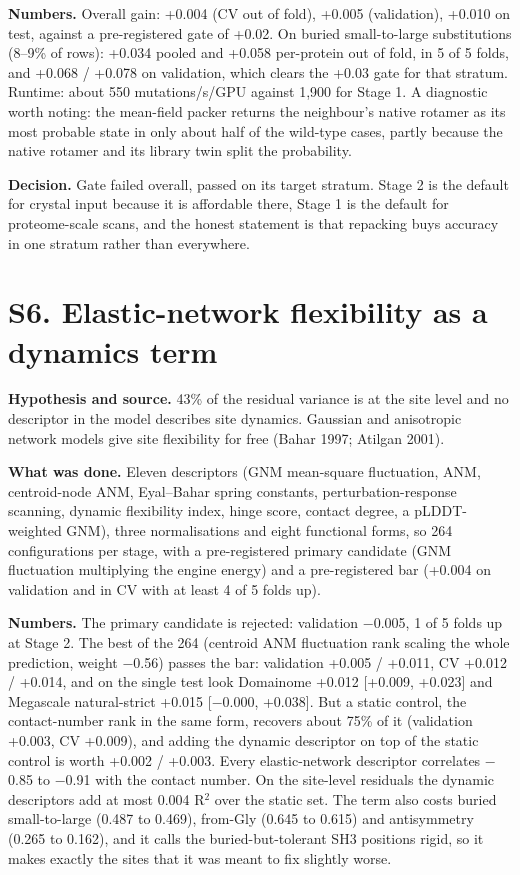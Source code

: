 \documentclass[11pt,a4paper]{article}
\begin{document}
\textbf{Numbers.} Overall gain: +0.004 (CV out of fold), +0.005 (validation), +0.010 on test, against a
pre-registered gate of +0.02. On buried small-to-large substitutions (8--9\% of rows): +0.034 pooled and +0.058
per-protein out of fold, in 5 of 5 folds, and +0.068 / +0.078 on validation, which clears the +0.03 gate for
that stratum. Runtime: about 550 mutations/s/GPU against 1,900 for Stage 1. A diagnostic worth noting: the
mean-field packer returns the neighbour's native rotamer as its most probable state in only about half of the
wild-type cases, partly because the native rotamer and its library twin split the probability.

\textbf{Decision.} Gate failed overall, passed on its target stratum. Stage 2 is the default for crystal input
because it is affordable there, Stage 1 is the default for proteome-scale scans, and the honest statement is
that repacking buys accuracy in one stratum rather than everywhere.



\section{S6. Elastic-network flexibility as a dynamics term}

\textbf{Hypothesis and source.} 43\% of the residual variance is at the site level and no descriptor in the model
describes site dynamics. Gaussian and anisotropic network models give site flexibility for free
(Bahar 1997; Atilgan 2001).

\textbf{What was done.} Eleven descriptors (GNM mean-square fluctuation, ANM, centroid-node ANM, Eyal--Bahar spring
constants, perturbation-response scanning, dynamic flexibility index, hinge score, contact degree, a
pLDDT-weighted GNM), three normalisations and eight functional forms, so 264 configurations per stage, with a
pre-registered primary candidate (GNM fluctuation multiplying the engine energy) and a pre-registered bar
(+0.004 on validation and in CV with at least 4 of 5 folds up).

\textbf{Numbers.} The primary candidate is rejected: validation $-$0.005, 1 of 5 folds up at Stage 2. The best of the
264 (centroid ANM fluctuation rank scaling the whole prediction, weight $-$0.56) passes the bar: validation
+0.005 / +0.011, CV +0.012 / +0.014, and on the single test look Domainome +0.012 [+0.009, +0.023] and
Megascale natural-strict +0.015 [$-$0.000, +0.038]. But a static control, the contact-number rank in the same
form, recovers about 75\% of it (validation +0.003, CV +0.009), and adding the dynamic descriptor on top of the
static control is worth +0.002 / +0.003. Every elastic-network descriptor correlates $-$0.85 to $-$0.91 with the
contact number. On the site-level residuals the dynamic descriptors add at most 0.004 R$^2$ over the static set.
The term also costs buried small-to-large (0.487 to 0.469), from-Gly (0.645 to 0.615) and antisymmetry (0.265
to 0.162), and it calls the buried-but-tolerant SH3 positions rigid, so it makes exactly the sites that it was meant
to fix slightly worse.
\end{document}

